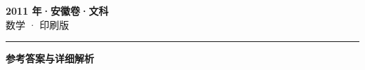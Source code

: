 \documentclass[zihao=5, a4paper]{ctexart}
\begin{document}
\begin{center}
  {\Large\bfseries 2011 年·安徽卷·文科}\\[4pt]
  {\large 数学 · 印刷版}
\end{center}
\medskip
{}

\par\bigskip\hrule\bigskip
{}
\begin{center}{\large\bfseries 参考答案与详细解析}\end{center}
\smallskip

\end{document}
